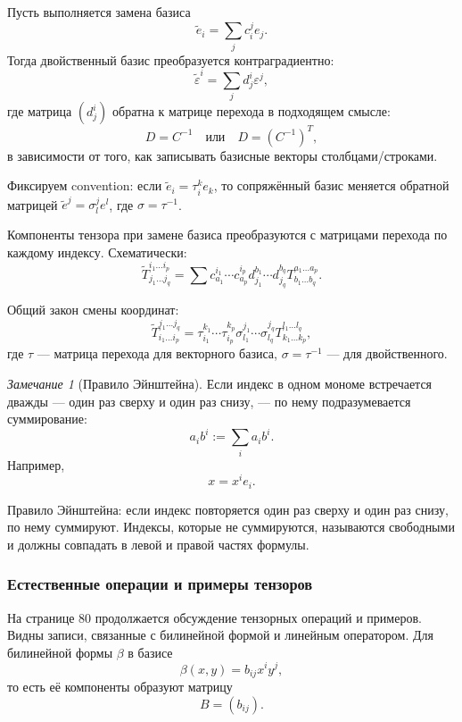 \documentclass[12pt,a4paper]{article}
\theoremstyle{definition}
\theoremstyle{plain}
\theoremstyle{remark}
\newtheorem{remark}[definition]{Замечание}
\newenvironment{knowledgefix}{\begin{clarifybox}}{\end{clarifybox}}
\begin{document}
Пусть выполняется замена базиса
\[
    \tilde e_i=\sum_j c_i^j e_j.
\]
Тогда двойственный базис преобразуется контраградиентно:
\[
    \tilde\varepsilon^i=\sum_j d^i_j\varepsilon^j,
\]
где матрица $(d^i_j)$ обратна к матрице перехода в подходящем смысле:
\[
    D=C^{-1}
    \quad \text{или} \quad
    D=(C^{-1})^T,
\]
в зависимости от того, как записывать базисные векторы столбцами/строками.
\begin{knowledgefix}
Фиксируем convention: если \(\tilde e_i=\tau^k_i e_k\), то сопряжённый базис меняется обратной матрицей \(\tilde e^{j}=\sigma^j_l e^l\), где \(\sigma=\tau^{-1}\).
\end{knowledgefix}

Компоненты тензора при замене базиса преобразуются с матрицами перехода по каждому индексу. Схематически:
\[
    \tilde T^{i_1\ldots i_p}_{j_1\ldots j_q}
    =
    \sum
    c^{i_1}_{a_1}\cdots c^{i_p}_{a_p}
    d^{b_1}_{j_1}\cdots d^{b_q}_{j_q}
    T^{a_1\ldots a_p}_{b_1\ldots b_q}.
\]
\begin{knowledgefix}
Общий закон смены координат:
\[\widetilde T^{j_1\ldots j_q}_{i_1\ldots i_p}=\tau^{k_1}_{i_1}\cdots\tau^{k_p}_{i_p}\sigma^{j_1}_{l_1}\cdots\sigma^{j_q}_{l_q}T^{l_1\ldots l_q}_{k_1\ldots k_p},\]
где \(\tau\) — матрица перехода для векторного базиса, \(\sigma=\tau^{-1}\) — для двойственного.
\end{knowledgefix}

\begin{remark}[Правило Эйнштейна]
Если индекс в одном мономе встречается дважды --- один раз сверху и один раз снизу, --- по нему подразумевается суммирование:
\[
    a_i b^i := \sum_i a_i b^i.
\]
Например,
\[
    x=x^i e_i.
\]
\begin{knowledgefix}
Правило Эйнштейна: если индекс повторяется один раз сверху и один раз снизу, по нему суммируют. Индексы, которые не суммируются, называются свободными и должны совпадать в левой и правой частях формулы.
\end{knowledgefix}
\end{remark}

\subsubsection*{Естественные операции и примеры тензоров}

На странице 80 продолжается обсуждение тензорных операций и примеров.
Видны записи, связанные с билинейной формой и линейным оператором. Для билинейной формы $\beta$ в базисе
\[
    \beta(x,y)=b_{ij}x^i y^j,
\]
то есть её компоненты образуют матрицу
\[
    B=(b_{ij}).
\]
\end{document}
